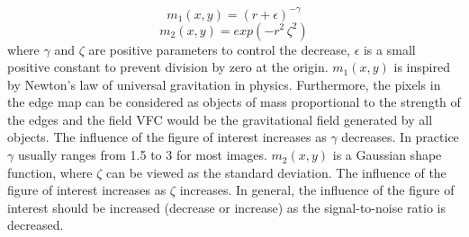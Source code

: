 \begin{equation}
{m} _{1} ( x,y ) =(r+\epsilon) ^{-\gamma}
\end{equation}
\begin{equation}
{m} _{2} ( x,y ) =exp(-r^{2}\, \zeta ^{2})
\end{equation}
where $\gamma$ and $\zeta$ are positive parameters to control the decrease, $\epsilon$ is a small positive constant to prevent division by zero at the origin. ${m} _{1} ( x,y )$ is inspired by Newton’s law  of universal gravitation in physics. Furthermore, the pixels in the edge map can be considered as objects of mass proportional to the strength of the edges and the field VFC would be the gravitational field generated by all objects. The influence of the figure of interest increases as $\gamma$ decreases. In practice $\gamma$ usually ranges from 1.5 to 3 for most images. ${m} _{2} ( x,y )$ is a Gaussian shape function, where $\zeta$ can be viewed as the standard deviation. The influence of the figure of interest increases as $\zeta$ increases. In general, the influence of the figure of interest should be increased (decrease or increase) as the signal-to-noise ratio is decreased.\cite{VFC}
